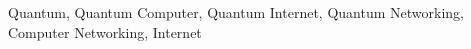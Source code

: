 \begin{IEEEkeywords}
  Quantum, Quantum Computer, Quantum Internet, Quantum Networking, Computer
  Networking, Internet
\end{IEEEkeywords}
